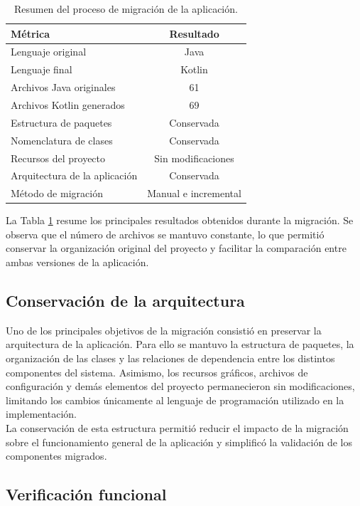 \documentclass[conference]{IEEEtran}
\begin{document}
\begin{table}[h]
	\centering
	\caption{Resumen del proceso de migración de la aplicación.}
	\label{tab1}
	\begin{tabular}{l|c}
		\textbf{Métrica} & \textbf{Resultado} \\
		\hline
		Lenguaje original & Java \\
		Lenguaje final & Kotlin \\
		Archivos Java originales & 61 \\
		Archivos Kotlin generados & 69 \\
		Estructura de paquetes & Conservada \\
		Nomenclatura de clases & Conservada \\
		Recursos del proyecto & Sin modificaciones \\
		Arquitectura de la aplicación & Conservada \\
		Método de migración & Manual e incremental \\
	\end{tabular}
\end{table}

La Tabla \ref{tab1} resume los principales resultados obtenidos durante la migración. Se observa que el número de archivos se mantuvo constante, lo que permitió conservar la organización original del proyecto y facilitar la comparación entre ambas versiones de la aplicación.\\

\subsection{Conservación de la arquitectura}

Uno de los principales objetivos de la migración consistió en preservar la arquitectura de la aplicación. Para ello se mantuvo la estructura de paquetes, la organización de las clases y las relaciones de dependencia entre los distintos componentes del sistema. Asimismo, los recursos gráficos, archivos de configuración y demás elementos del proyecto permanecieron sin modificaciones, limitando los cambios únicamente al lenguaje de programación utilizado en la implementación.\\

La conservación de esta estructura permitió reducir el impacto de la migración sobre el funcionamiento general de la aplicación y simplificó la validación de los componentes migrados.\\

\subsection{Verificación funcional}
\end{document}
